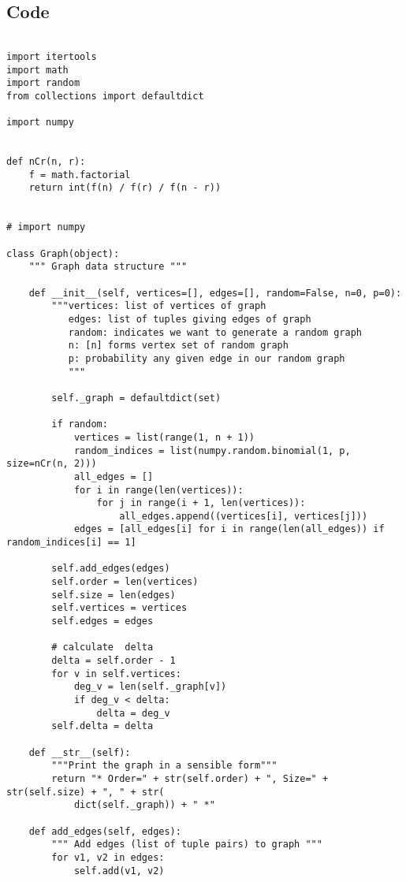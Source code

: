 \documentclass[10pt,a4paper]{report}
\begin{document}
\newpage

\subsection*{Code}

\small\begin{verbatim}

import itertools
import math
import random
from collections import defaultdict

import numpy


def nCr(n, r):
    f = math.factorial
    return int(f(n) / f(r) / f(n - r))


# import numpy

class Graph(object):
    """ Graph data structure """

    def __init__(self, vertices=[], edges=[], random=False, n=0, p=0):
        """vertices: list of vertices of graph
           edges: list of tuples giving edges of graph
           random: indicates we want to generate a random graph
           n: [n] forms vertex set of random graph
           p: probability any given edge in our random graph
           """

        self._graph = defaultdict(set)

        if random:
            vertices = list(range(1, n + 1))
            random_indices = list(numpy.random.binomial(1, p, size=nCr(n, 2)))
            all_edges = []
            for i in range(len(vertices)):
                for j in range(i + 1, len(vertices)):
                    all_edges.append((vertices[i], vertices[j]))
            edges = [all_edges[i] for i in range(len(all_edges)) if random_indices[i] == 1]

        self.add_edges(edges)
        self.order = len(vertices)
        self.size = len(edges)
        self.vertices = vertices
        self.edges = edges

        # calculate  delta
        delta = self.order - 1
        for v in self.vertices:
            deg_v = len(self._graph[v])
            if deg_v < delta:
                delta = deg_v
        self.delta = delta

    def __str__(self):
        """Print the graph in a sensible form"""
        return "* Order=" + str(self.order) + ", Size=" + str(self.size) + ", " + str(
            dict(self._graph)) + " *"

    def add_edges(self, edges):
        """ Add edges (list of tuple pairs) to graph """
        for v1, v2 in edges:
            self.add(v1, v2)


\end{verbatim}
\end{document}
